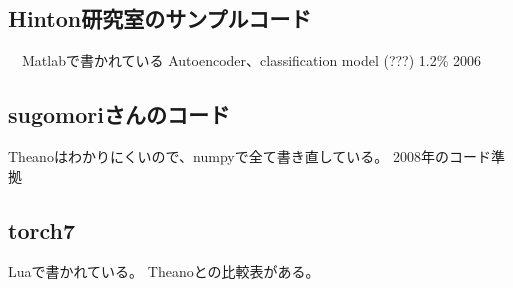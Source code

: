 
\subsection{Hinton研究室のサンプルコード}
　Matlabで書かれている
Autoencoder、classification model (???)
1.2\% 2006

\subsection{sugomoriさんのコード}
Theanoはわかりにくいので、numpyで全て書き直している。
2008年のコード準拠

\subsection{torch7}
Luaで書かれている。
Theanoとの比較表がある。

